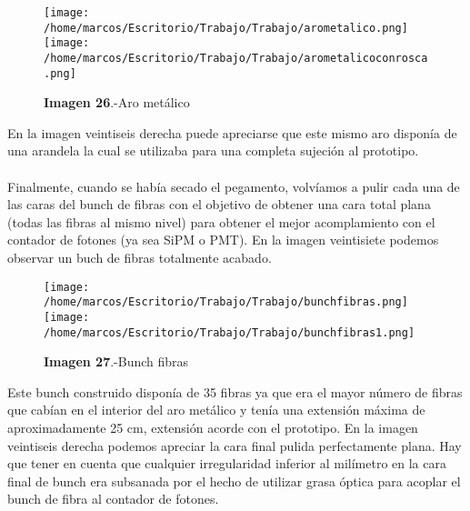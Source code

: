 \begin{figure}[htb]
\centering
{
\texttt{[image: /home/marcos/Escritorio/Trabajo/Trabajo/arometalico.png]} 
}
{
\texttt{[image: /home/marcos/Escritorio/Trabajo/Trabajo/arometalicoconrosca.png]} 
}
\caption{\textbf{Imagen 26}.-Aro metálico}
\end{figure} 

En la imagen veintiseis derecha puede apreciarse que este mismo aro disponía de una arandela la cual se utilizaba para una completa sujeción al prototipo.



\paragraph {}
Finalmente, cuando se había secado el pegamento, volvíamos a pulir cada una de las caras del bunch de fibras con el objetivo de obtener una cara total plana (todas las fibras al mismo nivel) para obtener el mejor acomplamiento con el contador de fotones (ya sea SiPM o PMT). En la imagen veintisiete podemos observar un buch de fibras totalmente acabado.

\begin{figure}[htb]
\centering
{
\texttt{[image: /home/marcos/Escritorio/Trabajo/Trabajo/bunchfibras.png]} 
}
{
\texttt{[image: /home/marcos/Escritorio/Trabajo/Trabajo/bunchfibras1.png]} 
}
\caption{\textbf{Imagen 27}.-Bunch fibras}
\end{figure} 

Este bunch construido disponía de 35 fibras ya que era el mayor número de fibras que cabían en el interior del aro metálico y tenía una extensión máxima de aproximadamente 25 cm, extensión acorde con el prototipo. En la imagen veintiseis derecha podemos apreciar la cara final pulida perfectamente plana. Hay que tener en cuenta que cualquier irregularidad inferior al milímetro en la cara final de bunch era subsanada por el hecho de utilizar grasa óptica para acoplar el bunch de fibra al contador de fotones.

\newpage